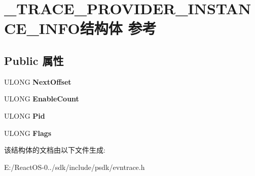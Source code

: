 \hypertarget{struct___t_r_a_c_e___p_r_o_v_i_d_e_r___i_n_s_t_a_n_c_e___i_n_f_o}{}\section{\+\_\+\+T\+R\+A\+C\+E\+\_\+\+P\+R\+O\+V\+I\+D\+E\+R\+\_\+\+I\+N\+S\+T\+A\+N\+C\+E\+\_\+\+I\+N\+F\+O结构体 参考}
\label{struct___t_r_a_c_e___p_r_o_v_i_d_e_r___i_n_s_t_a_n_c_e___i_n_f_o}
\subsection*{Public 属性}
\begin{DoxyCompactItemize}
\item 
\mbox{\label{struct___t_r_a_c_e___p_r_o_v_i_d_e_r___i_n_s_t_a_n_c_e___i_n_f_o_a823b5a79c95377c34d92f5794d894554}} 
U\+L\+O\+NG {\bfseries Next\+Offset}
\item 
\mbox{\label{struct___t_r_a_c_e___p_r_o_v_i_d_e_r___i_n_s_t_a_n_c_e___i_n_f_o_abff190107dd459467a6152d08454cf07}} 
U\+L\+O\+NG {\bfseries Enable\+Count}
\item 
\mbox{\label{struct___t_r_a_c_e___p_r_o_v_i_d_e_r___i_n_s_t_a_n_c_e___i_n_f_o_ac32072a7cc491606ddbb2e4397685aad}} 
U\+L\+O\+NG {\bfseries Pid}
\item 
\mbox{\label{struct___t_r_a_c_e___p_r_o_v_i_d_e_r___i_n_s_t_a_n_c_e___i_n_f_o_a02dcca4472a7a6ac8187134bc3090143}} 
U\+L\+O\+NG {\bfseries Flags}
\end{DoxyCompactItemize}


该结构体的文档由以下文件生成\+:\begin{DoxyCompactItemize}
\item 
E\+:/\+React\+O\+S-\/0../sdk/include/psdk/evntrace.\+h\end{DoxyCompactItemize}
